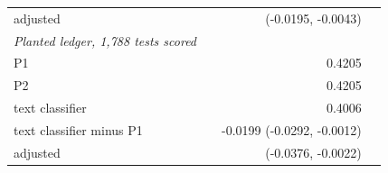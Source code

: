 \begin{tabular}{lrrr}
\quad adjusted &  & (-0.0195, -0.0043) &  \\
\emph{Planted ledger, 1,788 tests scored} &  &  &  \\
P1 &  & 0.4205 &  \\
P2 &  & 0.4205 &  \\
text classifier &  & 0.4006 &  \\
text classifier minus P1 &  & -0.0199 (-0.0292, -0.0012) &  \\
\quad adjusted &  & (-0.0376, -0.0022) &  \\
\bottomrule
\end{tabular}
